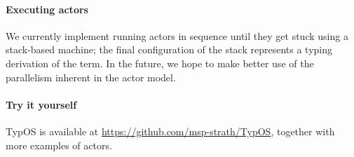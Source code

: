 \documentclass{easychair}
\newcommand{\TypOS}{TypOS\xspace}
\begin{document}
\paragraph{Executing actors}
We currently implement running actors in sequence until they get stuck
using a stack-based machine; the final configuration of the stack
represents a typing derivation of the term. In the future, we hope to
make better use of the parallelism inherent in the actor model.


\paragraph{Try it yourself}
\TypOS is available at \url{https://github.com/msp-strath/TypOS}, together with more examples of actors.








%
%
\end{document}
